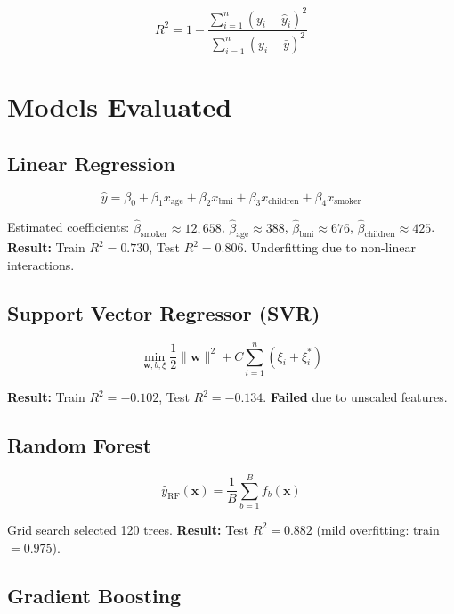 \documentclass[12pt,a4paper]{report}
\begin{document}
\begin{equation}
  R^2 = 1 - \frac{\sum_{i=1}^{n}(y_i - \hat{y}_i)^2}{\sum_{i=1}^{n}(y_i - \bar{y})^2}
\end{equation}

\section{Models Evaluated}

\subsection{Linear Regression}

\begin{equation}
  \hat{y} = \beta_0 + \beta_1 x_{\text{age}} + \beta_2 x_{\text{bmi}} + \beta_3 x_{\text{children}} + \beta_4 x_{\text{smoker}}
\end{equation}

Estimated coefficients: $\hat{\beta}_{\text{smoker}} \approx 12{,}658$, $\hat{\beta}_{\text{age}} \approx 388$, $\hat{\beta}_{\text{bmi}} \approx 676$, $\hat{\beta}_{\text{children}} \approx 425$.
\textbf{Result:} Train $R^2 = 0.730$, Test $R^2 = 0.806$. Underfitting due to non-linear interactions.

\subsection{Support Vector Regressor (SVR)}

\begin{equation}
  \min_{\mathbf{w},b,\xi} \frac{1}{2}\|\mathbf{w}\|^2 + C\sum_{i=1}^{n}(\xi_i + \xi_i^*)
\end{equation}

\textbf{Result:} Train $R^2 = -0.102$, Test $R^2 = -0.134$. \textcolor{failred}{\textbf{Failed}} due to unscaled features.

\subsection{Random Forest}

\begin{equation}
  \hat{y}_{\text{RF}}(\mathbf{x}) = \frac{1}{B}\sum_{b=1}^{B} f_b(\mathbf{x})
\end{equation}

Grid search selected 120 trees. \textbf{Result:} Test $R^2 = 0.882$ (mild overfitting: train $= 0.975$).

\subsection{Gradient Boosting}
\end{document}
